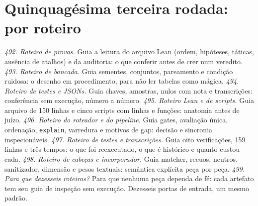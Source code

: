 \section{Quinquagésima terceira rodada: por roteiro}
\textit{492. Roteiro de provas.} Guia a leitura do arquivo Lean (ordem, hipóteses, táticas, ausência de atalhos) e da auditoria: o que conferir antes de crer num veredito.
\textit{493. Roteiro de bancada.} Guia sementes, conjuntos, pareamento e condição ruidosa: o desenho em procedimento, para não ler tabelas como mágica.
\textit{494. Roteiro de testes e JSONs.} Guia chaves, amostras, nulos com nota e transcrições: conferência sem execução, número a número.
\textit{495. Roteiro Lean e de scripts.} Guia arquivo de 150 linhas e cinco scripts com linhas e funções: anatomia antes de juízo.
\textit{496. Roteiro do roteador e do pipeline.} Guia gates, avaliação única, ordenação, \texttt{explain}, varredura e motivos de gap: decisão e sincronia inspecionáveis.
\textit{497. Roteiro de testes e transcrições.} Guia oito verificações, 159 linhas e três tempos: o que foi reexecutado, o que é histórico e quanto custou cada.
\textit{498. Roteiro de cabeças e incorporador.} Guia matcher, recuos, neutros, sanitizador, dimensão e pesos textuais: semântica explícita peça por peça.
\textit{499. Para que dezesseis roteiros?} Para que nenhuma peça dependa de fé: cada artefato tem seu guia de inspeção sem execução. Dezesseis portas de entrada, um mesmo padrão.
